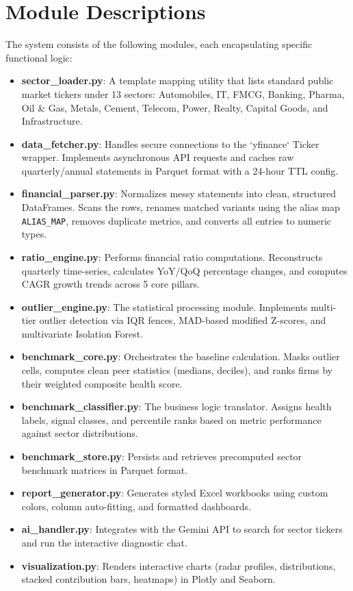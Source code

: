 \section{Module Descriptions}
The system consists of the following modules, each encapsulating specific functional logic:
\begin{itemize}
    \setlength{\itemsep}{1.5pt}
    \setlength{\parskip}{0pt}
    \setlength{\parsep}{0pt}
    \item \textbf{sector\_loader.py}: A template mapping utility that lists standard public market tickers under 13 sectors: Automobiles, IT, FMCG, Banking, Pharma, Oil \& Gas, Metals, Cement, Telecom, Power, Realty, Capital Goods, and Infrastructure.
    \item \textbf{data\_fetcher.py}: Handles secure connections to the `yfinance` Ticker wrapper. Implements asynchronous API requests and caches raw quarterly/annual statements in Parquet format with a 24-hour TTL config.
    \item \textbf{financial\_parser.py}: Normalizes messy statements into clean, structured DataFrames. Scans the rows, renames matched variants using the alias map \texttt{ALIAS\_MAP}, removes duplicate metrics, and converts all entries to numeric types.
    \item \textbf{ratio\_engine.py}: Performs financial ratio computations. Reconstructs quarterly time-series, calculates YoY/QoQ percentage changes, and computes CAGR growth trends across 5 core pillars.
    \item \textbf{outlier\_engine.py}: The statistical processing module. Implements multi-tier outlier detection via IQR fences, MAD-based modified Z-scores, and multivariate Isolation Forest.
    \item \textbf{benchmark\_core.py}: Orchestrates the baseline calculation. Masks outlier cells, computes clean peer statistics (medians, deciles), and ranks firms by their weighted composite health score.
    \item \textbf{benchmark\_classifier.py}: The business logic translator. Assigns health labels, signal classes, and percentile ranks based on metric performance against sector distributions.
    \item \textbf{benchmark\_store.py}: Persists and retrieves precomputed sector benchmark matrices in Parquet format.
    \item \textbf{report\_generator.py}: Generates styled Excel workbooks using custom colors, column auto-fitting, and formatted dashboards.
    \item \textbf{ai\_handler.py}: Integrates with the Gemini API to search for sector tickers and run the interactive diagnostic chat.
    \item \textbf{visualization.py}: Renders interactive charts (radar profiles, distributions, stacked contribution bars, heatmaps) in Plotly and Seaborn.
\end{itemize}
